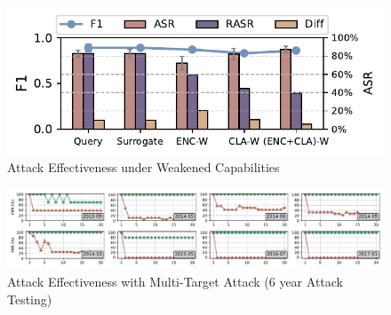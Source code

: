 \documentclass[lettersize,journal]{IEEEtran}
\begin{document}
\begin{figure}[h!]
	\centering
	\includegraphics[width=\linewidth,keepaspectratio]{Graph/Evaluation/Figure10_1.pdf}
	\caption{Attack Effectiveness under Weakened Capabilities}
	\label{fig:Attack-effectiveness-model-heterogeneity}
\end{figure}
\begin{figure}[t]
	\centering
	\includegraphics[width=\linewidth,keepaspectratio]{Graph/Evaluation/api_multi_attackers_fnr_1-up.pdf}
	\caption{Attack Effectiveness with Multi-Target Attack (6 year Attack Testing)}
	\label{fig: Attack Effectiveness with Multi-Target Attack}
\end{figure}
\end{document}
